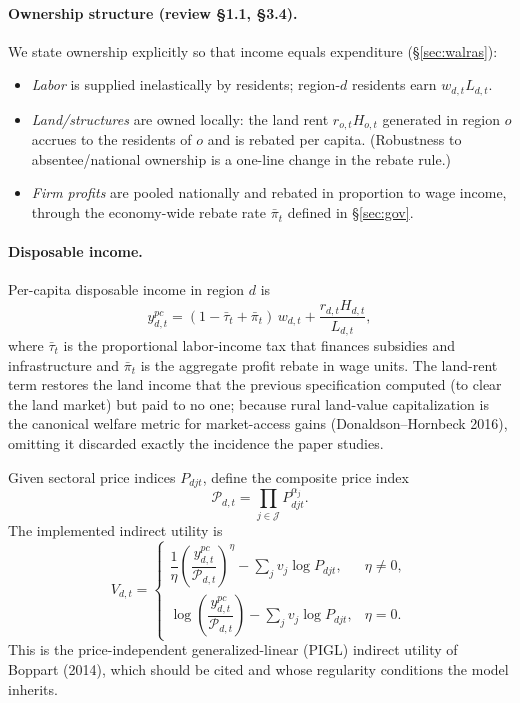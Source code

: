 \documentclass[11pt]{article}
\newcommand{\Sct}{\mathcal{J}}
\begin{document}
\paragraph{Ownership structure (review \S1.1, \S3.4).} We state ownership explicitly so
that income equals expenditure (\S\ref{sec:walras}):
\begin{itemize}[leftmargin=1.5em]
\item \emph{Labor} is supplied inelastically by residents; region-$d$ residents earn
      $w_{d,t}L_{d,t}$.
\item \emph{Land/structures} are owned locally: the land rent $r_{o,t}H_{o,t}$ generated
      in region $o$ accrues to the residents of $o$ and is rebated per capita. (Robustness
      to absentee/national ownership is a one-line change in the rebate rule.)
\item \emph{Firm profits} are pooled nationally and rebated in proportion to wage income,
      through the economy-wide rebate rate $\bar\pi_t$ defined in \S\ref{sec:gov}.
\end{itemize}

\paragraph{Disposable income.} Per-capita disposable income in region $d$ is
\begin{equation}
  y^{pc}_{d,t}
  = (1 - \bar\tau_t + \bar\pi_t)\, w_{d,t}
  + \frac{r_{d,t} H_{d,t}}{L_{d,t}},
  \label{eq:ypc}
\end{equation}
where $\bar\tau_t$ is the proportional labor-income tax that finances subsidies and
infrastructure and $\bar\pi_t$ is the aggregate profit rebate in wage units. The land-rent
term restores the land income that the previous specification computed
(to clear the land market) but paid to no one; because rural land-value capitalization is
the canonical welfare metric for market-access gains (Donaldson--Hornbeck 2016), omitting
it discarded exactly the incidence the paper studies.

Given sectoral price indices $P_{djt}$, define the composite price index
\begin{equation}
  \mathcal{P}_{d,t} = \prod_{j \in \Sct} P_{djt}^{\alpha_j}.
\end{equation}
The implemented indirect utility is
\begin{equation}
  V_{d,t} =
  \begin{cases}
    \dfrac{1}{\eta} \left( \dfrac{y^{pc}_{d,t}}{\mathcal{P}_{d,t}} \right)^{\eta}
    - \sum_j v_j \log P_{djt}, & \eta \ne 0, \\[1em]
    \log\!\left(\dfrac{y^{pc}_{d,t}}{\mathcal{P}_{d,t}}\right)
    - \sum_j v_j \log P_{djt}, & \eta = 0.
  \end{cases}
\end{equation}
This is the price-independent generalized-linear (PIGL) indirect utility of Boppart
(2014), which should be cited and whose regularity conditions the model inherits.
\end{document}
